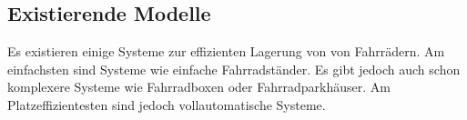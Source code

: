 \subsection{Existierende Modelle}

Es existieren einige Systeme zur effizienten Lagerung von von Fahrrädern. Am einfachsten sind Systeme wie einfache Fahrradständer. Es gibt jedoch auch schon komplexere Systeme wie Fahrradboxen oder Fahrradparkhäuser. Am Platzeffizientesten sind jedoch vollautomatische Systeme.











